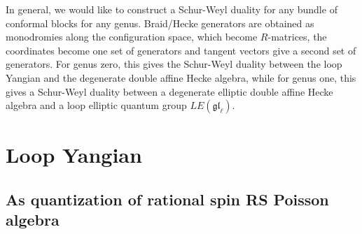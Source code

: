 \documentclass[11pt]{report}
\theoremstyle{definition}
\theoremstyle{remark}
\theoremstyle{remark}
\begin{document}
In general, we would like to construct a Schur-Weyl duality for any bundle of conformal blocks for any genus. Braid/Hecke generators are obtained as monodromies along the configuration space, which become $R$-matrices, the coordinates become one set of generators and tangent vectors give a second set of generators. For genus zero, this gives the Schur-Weyl duality between the loop Yangian and the degenerate double affine Hecke algebra, while for genus one, this gives a Schur-Weyl duality between a degenerate elliptic double affine Hecke algebra and a loop elliptic quantum group $LE(\mathfrak{gl}_\ell)$.

\section{Loop Yangian}

\subsection{As quantization of rational spin RS Poisson algebra}

\cite{article:arutyunov:1998}
\end{document}
